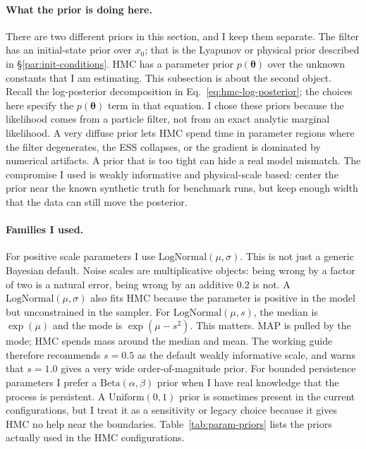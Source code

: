 \documentclass{article}
\renewcommand{\v}[1]{ \ensuremath{ {\mathbf{#1}} }}
\begin{document}
\paragraph{What the prior is doing here.}
There are two different priors in this section, and I keep them separate. The filter has an initial-state prior over $x_0$; that is the Lyapunov or physical prior described in \S\ref{par:init-conditions}. HMC has a parameter prior $p(\v\theta)$ over the unknown constants that I am estimating. This subsection is about the second object. Recall the log-posterior decomposition in Eq.~\ref{eq:hmc-log-posterior}; the choices here specify the $p(\v\theta)$ term in that equation.
I chose these priors because the likelihood comes from a particle filter, not from an exact analytic marginal likelihood. A very diffuse prior lets HMC spend time in parameter regions where the filter degenerates, the ESS collapses, or the gradient is dominated by numerical artifacts. A prior that is too tight can hide a real model mismatch. The compromise I used is weakly informative and physical-scale based: center the prior near the known synthetic truth for benchmark runs, but keep enough width that the data can still move the posterior.

\paragraph{Families I used.}
For positive scale parameters I use $\mathrm{LogNormal}(\mu,\sigma)$. This is not just a generic Bayesian default. Noise scales are multiplicative objects: being wrong by a factor of two is a natural error, being wrong by an additive $0.2$ is not. A $\mathrm{LogNormal}(\mu,\sigma)$ also fits HMC because the parameter is positive in the model but unconstrained in the sampler. For $\mathrm{LogNormal}(\mu,s)$, the median is $\exp(\mu)$ and the mode is $\exp(\mu-s^2)$. This matters. MAP is pulled by the mode; HMC spends mass around the median and mean. The working guide therefore recommends $s=0.5$ as the default weakly informative scale, and warns that $s=1.0$ gives a very wide order-of-magnitude prior. For bounded persistence parameters I prefer a $\mathrm{Beta}(\alpha,\beta)$ prior when I have real knowledge that the process is persistent. A $\mathrm{Uniform}(0,1)$ prior is sometimes present in the current configurations, but I treat it as a sensitivity or legacy choice because it gives HMC no help near the boundaries. Table~\ref{tab:param-priors} lists the priors actually used in the HMC configurations.
\end{document}
